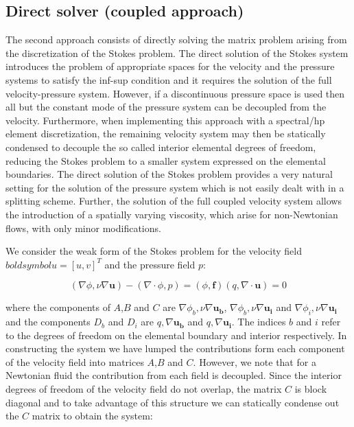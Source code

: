 \subsection{Direct solver (coupled approach)}
\label{DirectSolv}
The second approach consists of directly solving the matrix problem arising from the discretization of the Stokes problem.
The direct solution of the Stokes system introduces the problem of appropriate spaces for the velocity and the pressure systems to satisfy the inf-sup condition and it requires the solution of the full velocity-pressure system. However, if a discontinuous pressure space is used then all but the constant mode of the pressure system can be decoupled from the velocity. Furthermore, when implementing this approach with a spectral/hp element discretization, the remaining velocity system may then be statically condensed to decouple the so called interior elemental degrees of freedom, reducing the Stokes problem to a smaller system expressed on the elemental boundaries. The direct solution of the Stokes problem provides a very natural setting for the solution of the pressure system which is not easily dealt with in a splitting scheme. Further, the solution of the full coupled velocity system allows the introduction of a spatially varying viscosity, which arise for non-Newtonian flows, with only minor modifications.

We consider the weak form of the Stokes problem for the velocity field $boldsymbol{u}=[u,v]^{T}$ and the pressure field $p$:

\begin{subequations}
\begin{equation}
 (\nabla \phi,\nu \nabla \boldsymbol{u}) - (\nabla\cdot\phi,p)=(\phi,\boldsymbol{f})
\end{equation}
\begin{equation}
 (q,\nabla \cdot \boldsymbol{u}) = 0
\end{equation}
\end{subequations}

where the components of $A$,$B$ and $C$ are $\nabla\phi_b,\nu\nabla\boldsymbol{u_b}$, $\nabla\phi_b,\nu\nabla\boldsymbol{u_i}$ and $\nabla\phi_i,\nu\nabla\boldsymbol{u_i}$ and the components $D_b$ and $D_i$ are $q,\nabla\boldsymbol{u_b}$ and $q,\nabla\boldsymbol{u_i}$.
The indices $b$ and $i$ refer to the degrees of freedom on the elemental boundary and interior respectively. In constructing the system we have lumped the contributions form each component of the velocity field into matrices $A$,$B$ and $C$. However, we note that for a Newtonian fluid the contribution from each field is decoupled. Since the interior degrees of freedom of the velocity field do not overlap, the matrix $C$ is block diagonal and to take advantage of this structure we can statically condense out the $C$ matrix to obtain the system:

